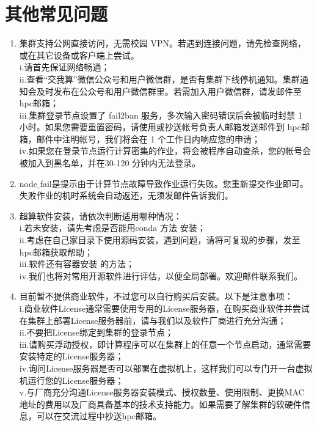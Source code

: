 \documentclass[cn, 12pt, hang, black, chinese]{elegantbook}
\begin{document}
\section{其他常见问题}
\begin{enumerate}[itemsep=1.3ex]
  \item {}
    集群支持公网直接访问，无需校园 VPN。若遇到连接问题，请先检查网络，或在其它设备或客户端上尝试。\\i.请首先保证网络畅通；\\ii.查看“交我算”微信公众号和用户微信群，是否有集群下线停机通知。集群通知会及时发布在公众号和用户微信群里。若需加入用户微信群，请发邮件至 hpc邮箱；\\iii.集群登录节点设置了 fail2ban 服务，多次输入密码错误后会被临时封禁 1 小时。如果您需要重置密码，请使用或抄送帐号负责人邮箱发送邮件到 hpc邮箱，邮件中注明帐号，我们将会在 1 个工作日内响应您的申请；\\iv.如果您在登录节点运行计算密集的作业，将会被程序自动查杀，您的帐号会被加入到黑名单，并在30-120 分钟内无法登录。
  \item {}
    node$\_$fail是提示由于计算节点故障导致作业运行失败。您重新提交作业即可。失败作业的机时系统会自动返还，无须发邮件告诉我们。
  \item {}
    超算软件安装，请依次判断适用哪种情况：\\i.若未安装，请先考虑是否能用conda 方法 安装；\\ii.考虑在自己家目录下使用源码安装，遇到问题，请将可复现的步骤，发至hpc邮箱获取帮助；\\iii.软件还有容器安装 的方法；\\iv.我们也将对常用开源软件进行评估，以便全局部署。欢迎邮件联系我们。
  \item {}
    目前暂不提供商业软件，不过您可以自行购买后安装。以下是注意事项：\\i.商业软件License通常需要使用专用的License服务器，在购买商业软件并尝试在集群上部署License服务器前，请与我们以及软件厂商进行充分沟通；\\ii.不要把License绑定到集群的登录节点；\\iii.请购买浮动授权，即计算程序可以在集群上的任意一个节点启动，通常需要安装特定的License服务器；\\iv.询问License服务器是否可以部署在虚拟机上，这样我们可以专门开一台虚拟机运行您的License服务器；\\v.与厂商充分沟通License服务器安装模式、授权数量、使用限制、更换MAC地址的费用以及厂商具备基本的技术支持能力。如果需要了解集群的软硬件信息，可以在交流过程中抄送hpc邮箱。

\end{enumerate}
\end{document}
